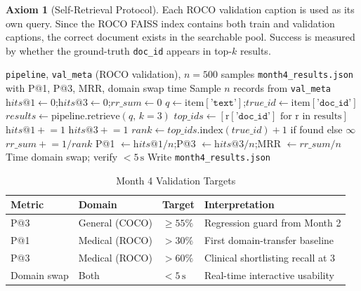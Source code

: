 \documentclass[12pt, a4paper]{article}
\theoremstyle{definition}
\newtheorem{axiom}{Axiom}[section]
\theoremstyle{plain}
\theoremstyle{remark}
\begin{document}
\begin{axiom}[Self-Retrieval Protocol]
Each ROCO validation caption is used as its own query. Since the ROCO FAISS index contains both train and validation captions, the correct document exists in the searchable pool. Success is measured by whether the ground-truth \texttt{doc\_id} appears in top-$k$ results.
\end{axiom}

\begin{algorithm}[H]
\caption{EVALUATE\_ROCO\_RETRIEVAL}
\label{alg:eval}
\begin{algorithmic}[1]
\Require \texttt{pipeline}, \texttt{val\_meta} (ROCO validation), $n=500$ samples
\Ensure \texttt{month4\_results.json} with P@1, P@3, MRR, domain swap time
\State Sample $n$ records from \texttt{val\_meta}
\State $\textit{hits}@1 \gets 0$;\quad $\textit{hits}@3 \gets 0$;\quad $\textit{rr\_sum} \gets 0$
  \State $q \gets \text{item}[\texttt{'text'}]$;\quad $\textit{true\_id} \gets \text{item}[\texttt{'doc\_id'}]$
  \State $\textit{results} \gets \text{pipeline.retrieve}(q,\, k=3)$
  \State $\textit{top\_ids} \gets [\text{r}[\texttt{'doc\_id'}] \text{ for r in results}]$
    \State $\textit{hits}@1 \mathrel{+}= 1$
  \EndIf
    \State $\textit{hits}@3 \mathrel{+}= 1$
  \EndIf
  \State $\textit{rank} \gets \textit{top\_ids}.\text{index}(\textit{true\_id}) + 1$ if found else $\infty$
  \State $\textit{rr\_sum} \mathrel{+}= 1/\textit{rank}$
\EndFor
\State P@1 $\gets \textit{hits}@1 / n$;\quad P@3 $\gets \textit{hits}@3 / n$;\quad MRR $\gets \textit{rr\_sum} / n$
\State Time domain swap; verify $< 5\,\text{s}$
\State Write \texttt{month4\_results.json}
\end{algorithmic}
\end{algorithm}

\begin{table}[h]
\centering
\caption{Month 4 Validation Targets}
\label{tab:targets}
\begin{tabular}{llll}
\toprule
\textbf{Metric} & \textbf{Domain} & \textbf{Target} & \textbf{Interpretation} \\
\midrule
P@3             & General (COCO)  & $\geq 55\%$ & Regression guard from Month 2 \\
P@1             & Medical (ROCO)  & $> 30\%$   & First domain-transfer baseline \\
P@3             & Medical (ROCO)  & $> 60\%$   & Clinical shortlisting recall at 3 \\
Domain swap     & Both            & $< 5\,\text{s}$ & Real-time interactive usability \\
\bottomrule
\end{tabular}
\end{table}
\end{document}
